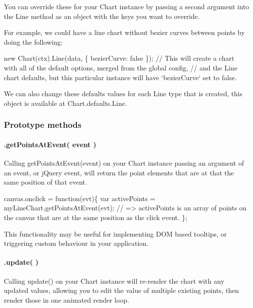 You can override these for your {\ttfamily Chart} instance by passing a second argument into the {\ttfamily Line} method as an object with the keys you want to override.

For example, we could have a line chart without bezier curves between points by doing the following\+:


\begin{DoxyCode}
new Chart(ctx).Line(data, \{
    bezierCurve: false
\});
// This will create a chart with all of the default options, merged from the global config,
// and the Line chart defaults, but this particular instance will have `bezierCurve` set to false.
\end{DoxyCode}


We can also change these defaults values for each Line type that is created, this object is available at {\ttfamily Chart.\+defaults.\+Line}.

\subsubsection*{Prototype methods}

\paragraph*{.get\+Points\+At\+Event( event )}

Calling {\ttfamily get\+Points\+At\+Event(event)} on your Chart instance passing an argument of an event, or j\+Query event, will return the point elements that are at that the same position of that event.


\begin{DoxyCode}
canvas.onclick = function(evt)\{
    var activePoints = myLineChart.getPointsAtEvent(evt);
    // => activePoints is an array of points on the canvas that are at the same position as the click
       event.
\};
\end{DoxyCode}


This functionality may be useful for implementing D\+OM based tooltips, or triggering custom behaviour in your application.

\paragraph*{.update( )}

Calling {\ttfamily update()} on your Chart instance will re-\/render the chart with any updated values, allowing you to edit the value of multiple existing points, then render those in one animated render loop.


